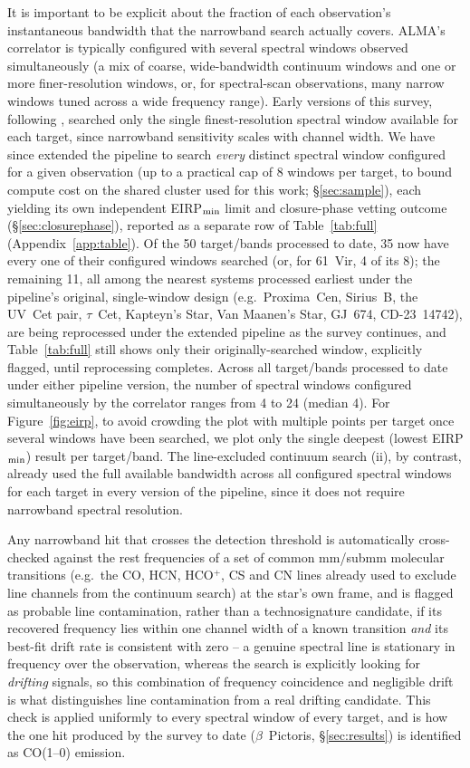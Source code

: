 \documentclass{openjournal}
\begin{document}
It is important to be explicit about the fraction of each observation's
instantaneous bandwidth that the narrowband search actually covers.
ALMA's correlator is typically configured with several spectral windows
observed simultaneously (a mix of coarse, wide-bandwidth continuum
windows and one or more finer-resolution windows, or, for spectral-scan
observations, many narrow windows tuned across a wide frequency range).
Early versions of this survey, following \citet{Mason2024}, searched
only the single finest-resolution spectral window available for each
target, since narrowband sensitivity scales with channel width. We have
since extended the pipeline to search \emph{every} distinct spectral
window configured for a given observation (up to a practical cap of 8
windows per target, to bound compute cost on the shared cluster used for
this work; \S\ref{sec:sample}), each yielding its own independent
EIRP$_{\rm min}$ limit and closure-phase vetting outcome
(\S\ref{sec:closurephase}), reported as a separate row of
Table~\ref{tab:full} (Appendix~\ref{app:table}). Of the 50 target/bands
processed to date, 35 now have every one of their configured windows
searched (or, for 61~Vir, 4 of its 8); the remaining 11, all among the
nearest systems processed earliest under the pipeline's original,
single-window design (e.g.\ Proxima~Cen, Sirius~B, the UV~Cet pair,
$\tau$~Cet, Kapteyn's Star, Van Maanen's Star, GJ~674, CD-23~14742), are
being reprocessed under the extended pipeline as the survey continues,
and Table~\ref{tab:full} still shows only their originally-searched
window, explicitly flagged, until reprocessing completes. Across all
target/bands processed to date under either pipeline version, the number
of spectral
windows configured simultaneously by the correlator ranges from 4 to 24
(median 4). For Figure~\ref{fig:eirp}, to avoid crowding the plot with
multiple points per target once several windows have been searched, we
plot only the single deepest (lowest EIRP$_{\rm min}$) result per
target/band. The line-excluded continuum search (ii), by contrast,
already used the full available bandwidth across all configured spectral
windows for each target in every version of the pipeline, since it does
not require narrowband spectral resolution.

Any narrowband hit that crosses the detection threshold is automatically
cross-checked against the rest frequencies of a set of common mm/submm
molecular transitions (e.g.\ the CO, HCN, HCO$^{+}$, CS and CN lines
already used to exclude line channels from the continuum search) at the
star's own frame, and is flagged as probable line contamination, rather
than a technosignature candidate, if its recovered frequency lies within
one channel width of a known transition \emph{and} its best-fit drift
rate is consistent with zero -- a genuine spectral line is stationary in
frequency over the observation, whereas the search is explicitly looking
for \emph{drifting} signals, so this combination of frequency
coincidence and negligible drift is what distinguishes line
contamination from a real drifting candidate. This check is applied
uniformly to every spectral window of every target, and is how the one
hit produced by the survey to date ($\beta$~Pictoris, \S\ref{sec:results})
is identified as CO(1--0) emission.
\end{document}

